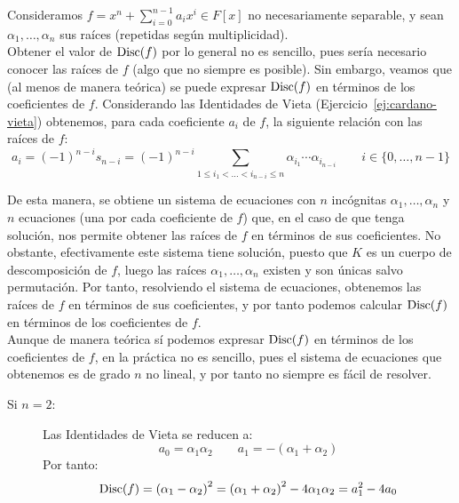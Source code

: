 \begin{ejemplo}
    Consideramos $f = x^n +\sum\limits_{i=0}^{n-1}a_ix^i \in F[x]$ no necesariamente separable, y sean $\alpha_1, \ldots, \alpha_n$ sus raíces (repetidas según multiplicidad).\\

    Obtener el valor de $\operatorname{Disc}(f)$ por lo general no es sencillo, pues sería necesario conocer las raíces de $f$ (algo que no siempre es posible). Sin embargo, veamos que (al menos de manera teórica) se puede expresar $\operatorname{Disc}(f)$ en términos de los coeficientes de $f$. Considerando las Identidades de Vieta (Ejercicio~\ref{ej:cardano-vieta}) obtenemos, para cada coeficiente $a_i$ de $f$, la siguiente relación con las raíces de $f$:
    \begin{equation*}
        a_i = {(-1)}^{n-i}s_{n-i} = {(-1)}^{n-i}\sum_{1\leq i_1 < \ldots < i_{n-i} \leq n} \alpha_{i_1}\cdots\alpha_{i_{n-i}}\qquad i\in \{0,\ldots,n-1\}
    \end{equation*}

    De esta manera, se obtiene un sistema de ecuaciones con $n$ incógnitas $\alpha_1, \ldots, \alpha_n$ y $n$ ecuaciones (una por cada coeficiente de $f$) que, en el caso de que tenga solución, nos permite obtener las raíces de $f$ en términos de sus coeficientes. No obstante, efectivamente este sistema tiene solución, puesto que $K$ es un cuerpo de descomposición de $f$, luego las raíces $\alpha_1, \ldots, \alpha_n$ existen y son únicas salvo permutación. Por tanto, resolviendo el sistema de ecuaciones, obtenemos las raíces de $f$ en términos de sus coeficientes, y por tanto podemos calcular $\operatorname{Disc}(f)$ en términos de los coeficientes de $f$.\\

    Aunque de manera teórica sí podemos expresar $\operatorname{Disc}(f)$ en términos de los coeficientes de $f$, en la práctica no es sencillo, pues el sistema de ecuaciones que obtenemos es de grado $n$ no lineal, y por tanto no siempre es fácil de resolver.
    \begin{description}
        \item[Si $n=2$:] Las Identidades de Vieta se reducen a:
        \begin{equation*}
            a_0 = \alpha_1\alpha_2 \qquad a_1 = -(\alpha_1+\alpha_2)
        \end{equation*}
        Por tanto:
        \begin{equation*}
            \operatorname{Disc}(f) = {(\alpha_1-\alpha_2)}^{2} = {(\alpha_1+\alpha_2)}^{2} - 4\alpha_1\alpha_2 = a_1^2 - 4a_0
        \end{equation*}


\end{description}
\end{ejemplo}
